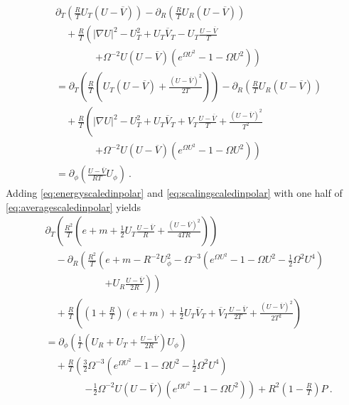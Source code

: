 \documentclass[a4paper]{amsart}
\providecommand{\abs}[1]{\lvert #1 \rvert}
\begin{document}
\begin{equation}
  \begin{split}
    &{\partial}_T
    \left(
    \frac{R}{T} U_T (U - \overline{V})
    \right)
    -
    \partial_R
    \left(
    \frac{R}{T} U_R (U - \overline{V})
    \right) \\
    &\quad+
    \frac{R}{T}
    \left(
    \abs{\nabla U}^2 - U_T^2 + U_T \overline{V}_T
    -
    U_T \frac{U - \overline{V}}{T}
    \right.
    \\
    &\qquad \qquad
    \left.+
    \Omega^{-2} U (U - \overline{V}) (e^{\Omega U^2} - 1 - \Omega U^2)
    \right) \\
    &=
    {\partial}_T
    \left(
    \frac{R}{T} (U_T (U - \overline{V}) + \frac{(U - \overline{V})^2}{2 T})
    \right)
    -
    \partial_R
    \left(
    \frac{R}{T} U_R (U - \overline{V})
    \right) \\
    &\quad+
    \frac{R}{T}
    \left(
    \abs{\nabla U}^2 - U_T^2 + U_T \overline{V}_T
    +
    V_T \frac{U - \overline{V}}{T}
    +
    \frac{(U - \overline{V})^2}{T^2}
    \right.
    \\
    &\qquad \qquad
    \left.
    +
    \Omega^{-2} U (U - \overline{V}) (e^{\Omega U^2} - 1 - \Omega U^2)
    \right) \\
    &=
    \partial_\phi
    \left(
    \frac{U - \overline{V}}{R T} U_\phi
    \right)
    \ .
  \end{split}
  \label{eq:averagescaledinpolar}
\end{equation}
Adding \eqref{eq:energyscaledinpolar} and
\eqref{eq:scalingscaledinpolar} with one half of
\eqref{eq:averagescaledinpolar} yields
\begin{equation}
  \begin{split}
    &{\partial}_T
    \left(
    \frac{R^2}{T}
    (e + m
    +
    \frac{1}{2} U_T \frac{U - \overline{V}}{R}
    +
    \frac{(U - \overline{V})^2}{4 T R}
    )
    \right) \\ 
    &\quad
    -
    \partial_R
    \left(
    \frac{R^2}{T}
    \left(
    e + m
    -
    R^{-2} U_\phi^2
    -
    \Omega^{-3}
    (e^{\Omega U^2} - 1 - \Omega U^2 - \frac{1}{2} \Omega^2 U^4)
    \right.
    \right.
    \\
    &\qquad \qquad \qquad
    \left.
    \left.
    +
    U_R \frac{U - \overline{V}}{2 R}
    \right) \right) \\
    &\quad
    +
    \frac{R}{T}
    \left(
    (1 + \frac{R}{T}) (e + m)
    +
    \frac{1}{2} U_T \overline{V}_T
    +
    \overline{V}_T \frac{U - \overline{V}}{2 T}
    +
    \frac{(U - \overline{V})^2}{2 T^2}
    \right) \\
    &=
    \partial_\phi
    \left(
    \frac{1}{T}
    (U_R + U_T + \frac{U - \overline{V}}{2 R}) U_\phi
    \right) \\
    &\quad
    +
    \frac{R}{T}
    \left(
    \frac{3}{2} \Omega^{-3} (e^{\Omega U^2} - 1 - \Omega U^2 -
    \frac{1}{2} \Omega^2 U^4)
    \right.
    \\
    &\qquad \qquad
    \left.
    -
    \frac{1}{2} \Omega^{-2} U (U - \overline{V}) (e^{\Omega U^2} - 1 -
    \Omega U^2)
    \right) 
    +
    R^2 (1 - \frac{R}{T}) P \ .
  \end{split}
  \label{eq:lemmaequation}
\end{equation}
\end{document}
